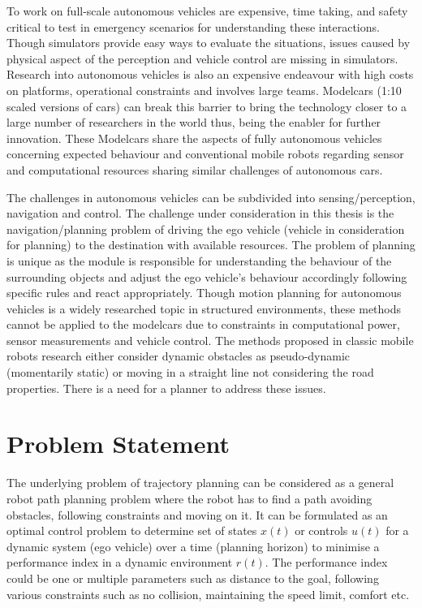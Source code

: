 To work on full-scale autonomous vehicles are expensive, time taking, and safety critical to test in emergency scenarios for understanding these interactions. Though simulators provide easy ways to evaluate the situations, issues caused by physical aspect of the perception and vehicle control are missing in simulators. Research into autonomous vehicles is also an expensive endeavour with high costs on platforms, operational constraints and involves large teams. Modelcars (1:10 scaled versions of cars) can break this barrier to bring the technology closer to a large number of researchers in the world thus, being the enabler for further innovation. These Modelcars share the aspects of fully autonomous vehicles concerning expected behaviour and conventional mobile robots regarding sensor and computational resources sharing similar challenges of autonomous cars. 

The challenges in autonomous vehicles can be subdivided into sensing/perception, navigation and control. The challenge under consideration in this thesis is the navigation/planning problem of driving the ego vehicle (vehicle in consideration for planning) to the destination with available resources. The problem of planning is unique as the module is responsible for understanding the behaviour of the surrounding objects and adjust the ego vehicle's behaviour accordingly following specific rules and react appropriately. Though motion planning for autonomous vehicles is a widely researched topic in structured environments, these methods cannot be applied to the modelcars due to constraints in computational power, sensor measurements and vehicle control. The methods proposed in classic mobile robots research either consider dynamic obstacles as pseudo-dynamic (momentarily static) or moving in a straight line not considering the road properties. There is a need for a planner to address these issues. 

\section{Problem Statement}

The underlying problem of trajectory planning can be considered as a general robot path planning problem where the robot has to find a path avoiding obstacles, following constraints and moving on it. It can be formulated as an optimal control problem to determine set of states $x(t)$ or controls $u(t)$ for a dynamic system (ego vehicle) over a time (planning horizon) to minimise a performance index in a dynamic environment $r(t)$. The performance index could be one or multiple parameters such as distance to the goal, following various constraints such as no collision, maintaining the speed limit, comfort etc.


